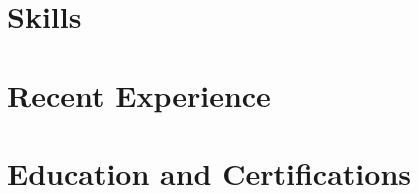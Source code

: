 \documentclass[a4paper,12pt]{article}
\begin{document}


\section{Skills}


\section{Recent Experience}


\section{Education and Certifications}


\end{document}
